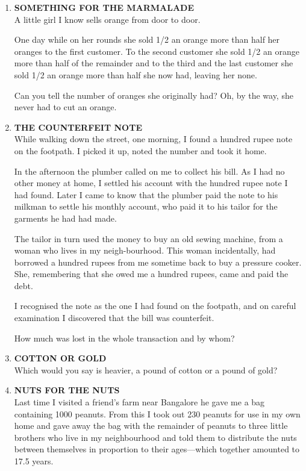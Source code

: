 \documentclass[12pt]{article}
\begin{document}
\begin{enumerate}
%
\item \textbf{SOMETHING  FOR  THE  MARMALADE} \\
A little  girl I know  sells  orange  from  door  to door. 

One day while  on her  rounds  she  sold  1/2 an orange more  than  half  her oranges  to the first  customer.  To  the second  customer  she sold  1/2 an orange  more  than  half  of the remainder  and to the third  and  the last  customer  she sold 1/2 an orange  more  than  half  she now  had,  leaving  her none. 

Can you tell the number  of oranges  she originally  had? Oh, by the way,  she never  had to cut an orange. 

%
\item \textbf{THE  COUNTERFEIT  NOTE} \\
While  walking  down  the street,  one  morning,  I found  a hundred  rupee  note  on the  footpath.  I picked  it up, noted  the number  and took  it home. 

In the  afternoon  the plumber  called  on me to collect his bill. As  I had no other  money  at home,  I settled  his account  with  the hundred  rupee  note  I had found.  Later I came  to know  that  the  plumber  paid  the note  to his milkman  to settle  his monthly  account,  who  paid  it to his tailor  for the garments  he had had made. 

The tailor  in turn  used  the  money  to buy  an old sewing  machine,  from  a woman  who  lives  in my  neigh-bourhood.  This  woman  incidentally,  had  borrowed  a hundred  rupees  from  me sometime  back  to buy  a pressure cooker.  She,  remembering  that  she  owed  me a hundred rupees,  came  and paid  the debt. 

I recognised  the  note  as the one I had found  on the footpath,  and on careful  examination  I discovered  that the bill was counterfeit. 

How  much  was  lost in the whole  transaction  and  by whom? 


%
\item \textbf{COTTON  OR  GOLD} \\
Which  would  you  say  is heavier,  a pound  of cotton or a pound  of gold? 

%
\item \textbf{NUTS  FOR  THE  NUTS} \\ 
Last time  I visited  a friend's  farm  near  Bangalore  he gave me a bag containing  1000  peanuts.  From  this I took out 230  peanuts  for  use  in my  own  home  and gave away  the bag with  the remainder  of peanuts  to three  little brothers  who  live  in my neighbourhood  and  told  them  to distribute  the nuts  between  themselves  in proportion  to their ages—which  together  amounted  to 17.5 years. 


\end{enumerate}
\end{document}
